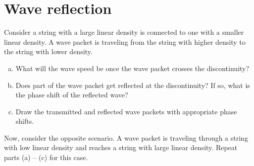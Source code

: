 \documentclass[11pt]{article}
\begin{document}
\section{Wave reflection}

Consider a string with a large linear density is connected to one with a smaller linear density. A wave packet is traveling from the string with higher density to the string with lower density.
\begin{enumerate}[(a)]
	\item What will the wave speed be once the wave packet crosses the discontinuity?
	\item Does part of the wave packet get reflected at the discontinuity? If so, what is the phase shift of the reflected wave?
	\item Draw the transmitted and reflected wave packets with appropriate phase shifts.
\end{enumerate}
Now, consider the opposite scenario. A wave packet is traveling through a string with low linear density and reaches a string with large linear density. Repeat parts (a) -- (c) for this case.
\end{document}
